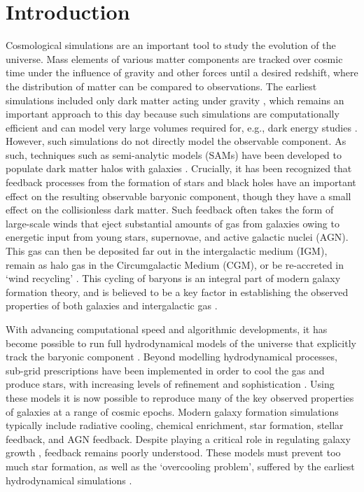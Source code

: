 \section{Introduction}
\label{sec:introduction}

Cosmological simulations are an important tool to study the evolution of the
universe. Mass elements of various matter components are tracked over cosmic
time under the influence of gravity and other forces until a desired
redshift, where the distribution of matter can be compared to observations.
The earliest simulations included only dark matter acting under gravity
\citep[see e.g.][]{Frenk1988, Springel2005a}, which remains an important
approach to this day because such simulations are computationally efficient
and can model very large volumes required for, e.g., dark energy studies
\citep{Knabenhans2019}. However, such simulations do not directly model the
observable component. As such, techniques such as semi-analytic models (SAMs)
have been developed \citep{FrenkWhite1990,Kauffmann1996,Somerville1998} to
populate dark matter halos with galaxies \citep[see e.g.][for modern examples
of SAM frameworks]{Porter2014, Henriques2015, Somerville2015b, Lacey2016}.
Crucially, it has been recognized that feedback processes from the formation
of stars and black holes have an important effect on the resulting observable
baryonic component, though they have a small effect on the collisionless dark
matter. Such feedback often takes the form of large-scale winds that eject
substantial amounts of gas from galaxies owing to energetic input from young
stars, supernovae, and active galactic nuclei (AGN). This gas can then be
deposited far out in the intergalactic medium (IGM), remain as halo gas in
the Circumgalactic Medium (CGM), or be re-accreted in `wind recycling'
\citep{Oppenheimer2010, Christensen2016, AnglesAlcazar2017, Hafen2017,
Christensen2018}. This cycling of baryons is an integral part of modern
galaxy formation theory, and is believed to be a key factor in establishing
the observed properties of both galaxies and intergalactic gas
\citep{Somerville2015}.

With advancing computational speed and algorithmic developments, it has
become possible to run full hydrodynamical models of the universe that
explicitly track the baryonic component \citep[e.g.][]{Hernquist1989,
Teyssier2002, Springel2005b}. Beyond modelling hydrodynamical processes,
sub-grid prescriptions have been implemented in order to cool the gas and
produce stars, with increasing levels of refinement and sophistication
\citep[e.g.][]{Revaz2012, Vogelsberger2014, Schaye2015, Hopkins2018}. Using
these models it is now possible to reproduce many of the key observed
properties of galaxies at a range of cosmic epochs. Modern galaxy formation
simulations typically include radiative cooling, chemical enrichment, star
formation, stellar feedback, and AGN feedback. Despite playing a critical
role in regulating galaxy growth \citep{Naab2017}, feedback remains poorly
understood. These models must prevent too much star formation, as well as the
`overcooling problem', suffered by the earliest hydrodynamical simulations
\citep{Dave2001,Balogh2001}.


